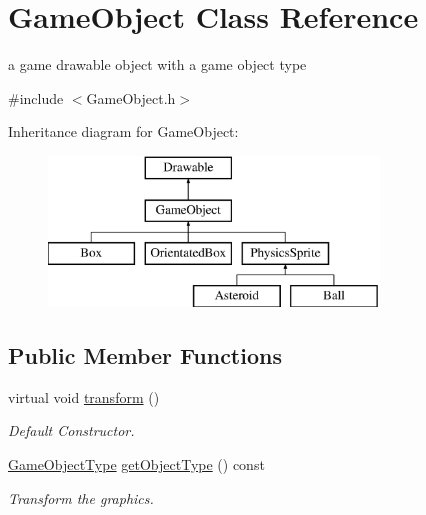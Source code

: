 \hypertarget{class_game_object}{\section{Game\+Object Class Reference}
\label{class_game_object}
}


a game drawable object with a game object type  




{\ttfamily \#include $<$Game\+Object.\+h$>$}

Inheritance diagram for Game\+Object\+:\begin{figure}[H]
\begin{center}
\leavevmode
\includegraphics[height=4.000000cm]{class_game_object}
\end{center}
\end{figure}
\subsection*{Public Member Functions}
\begin{DoxyCompactItemize}
\item 
\hypertarget{class_game_object_a93dd079d4f47880491665b4a83eb687d}{virtual void \hyperlink{class_game_object_a93dd079d4f47880491665b4a83eb687d}{transform} ()}\label{class_game_object_a93dd079d4f47880491665b4a83eb687d}

\begin{DoxyCompactList}\small\item\em Default Constructor. \end{DoxyCompactList}\item 
\hypertarget{class_game_object_af7a8fd8ce2f6955b378e2292f2475e4d}{\hyperlink{_game_config_8h_a57678b60d65afb213d04a6b090c64a08}{Game\+Object\+Type} \hyperlink{class_game_object_af7a8fd8ce2f6955b378e2292f2475e4d}{get\+Object\+Type} () const }\label{class_game_object_af7a8fd8ce2f6955b378e2292f2475e4d}

\begin{DoxyCompactList}\small\item\em Transform the graphics. \end{DoxyCompactList}\end{DoxyCompactItemize}
